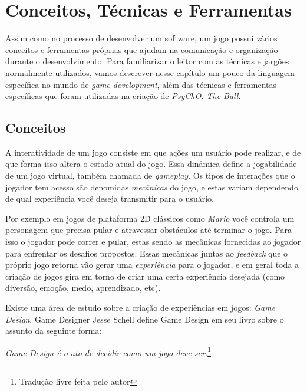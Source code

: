 
\chapter{Conceitos, Técnicas e Ferramentas}
\label{cap:conceitos_tecnicas_e_ferramentas}

Assim como no processo de desenvolver um software, um jogo possui vários conceitos e ferramentas próprias que ajudam na comunicação e organização durante o desenvolvimento.
Para familiarizar o leitor com as técnicas e jargões normalmente utilizados, vamos descrever nesse capítulo um pouco da linguagem específica no mundo de \textit{game development}, além das técnicas e ferramentas específicas que foram utilizadas na criação de \textit{PsyChO: The Ball}.

\section{Conceitos}
\label{sec:conceitos}
A interatividade de um jogo consiste em que ações um usuário pode realizar, e de que forma isso altera o estado atual do jogo. Essa dinâmica define a jogabilidade de um jogo virtual, também chamada de \textit{gameplay}. Os tipos de interações que o jogador tem acesso são denomidas \textit{mecânicas} do jogo, e estas variam dependendo de qual experiência você deseja transmitir para o usuário.

Por exemplo em jogos de plataforma 2D clássicos como \textit{Mario} você controla um personagem que precisa pular e atravessar obstáculos até terminar o jogo. Para isso o jogador pode correr e pular, estas sendo as mecânicas fornecidas ao jogador para enfrentar os desafios propostos. Essas mecânicas juntas ao \textit{feedback} que o próprio jogo retorna vão gerar uma \textit{experiência} para o jogador, e em geral toda a criação de jogos gira em torno de criar uma certa experiência desejada (como diversão, emoção, medo, aprendizado, etc).

Existe uma área de estudo sobre a criação de experiências em jogos: \textit{Game Design}. Game Designer Jesse Schell define Game Design em seu livro sobre o assunto \cite{jessegamedesign} da seguinte forma:

\begin{displayquote}
  \textit{Game Design é o ato de decidir como um jogo deve ser.}\footnote{Tradução livre feita pelo autor}
\end{displayquote}

